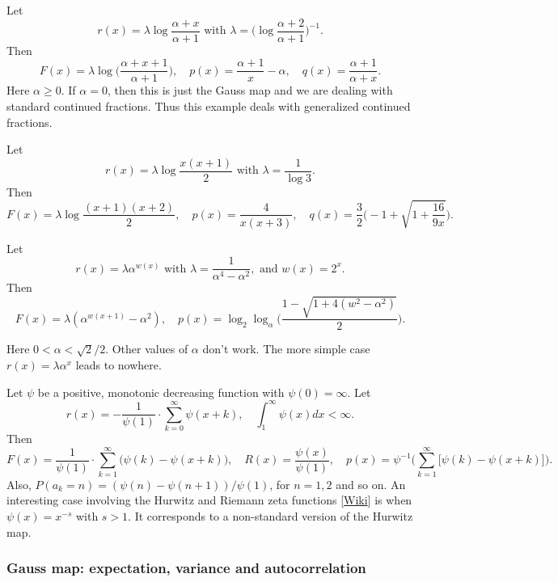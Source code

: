 \documentclass[oneside,10pt]{book}
\begin{document}
\noindent Let
$$r(x)=\lambda\log\frac{\alpha+x}{\alpha+1} \mbox{ with }\lambda=\Big(\log\frac{\alpha+2}{\alpha+1}\Big)^{-1}.$$
Then
$$F(x)=\lambda\log\Big(\frac{\alpha+x+1}{\alpha+1}\Big), \quad
p(x)=\frac{\alpha+1}{x}-\alpha, \quad q(x)=\frac{\alpha+1}{\alpha+x}.$$
Here $\alpha\geq 0$. If $\alpha=0$, then this is just the Gauss map and we are dealing with standard continued fractions.
 Thus this example deals with \textcolor{index}{generalized continued fractions}. \vspace{1ex}


\noindent Let
$$r(x)=\lambda\log\frac{x(x+1)}{2} \mbox{ with }\lambda=\frac{1}{\log 3}.$$
Then $$F(x)=\lambda\log\frac{(x+1)(x+2)}{2}, \quad
p(x)=\frac{4}{x(x+3)}, \quad q(x)=\frac{3}{2}\Bigg(-1+\sqrt{1+\frac{16}{9x}}\Bigg).$$


\noindent Let
$$r(x)=\lambda \alpha^{w(x)} \mbox{ with }\lambda=\frac{1}{\alpha^4-\alpha^2},
 \text{ and }w(x)=2^x.
$$
Then
$$ F(x)=\lambda(\alpha^{w(x+1)}-\alpha^2), \quad
p(x)=\log_2\log_\alpha\Bigg(\frac{1-\sqrt{1+4(w^2-\alpha^2)}}{2}\Bigg).$$

\noindent Here $0<\alpha<\sqrt{2}/2$. Other values of $\alpha$ don't work. The more simple case $r(x)=\lambda \alpha^x$ leads to nowhere. \vspace{1ex}


\noindent Let $\psi$ be a positive, monotonic decreasing function with $\psi(0)=\infty$. 
Let
$$r(x)=-\frac{1}{\psi(1)}\cdot \sum_{k=0}^\infty \psi(x+k), \quad \int_1^\infty\psi(x)dx<\infty.$$ 
Then
$$F(x)= \frac{1}{\psi(1)}\cdot \sum_{k=1}^\infty \Big(\psi(k)-\psi(x+k)\Big),\quad
R(x)=\frac{\psi(x)}{\psi(1)}, \quad p(x)=\psi^{-1}\Bigg(\sum_{k=1}^\infty \Big[\psi(k)-\psi(x+k)\Big]\Bigg).$$
Also, $P(a_k=n) = (\psi(n)-\psi(n+1))/\psi(1)$, for $n=1,2$ and so on. An interesting case involving the 
\textcolor{index}{Hurwitz} and 
\textcolor{index}{Riemann zeta} functions  [\href{https://en.wikipedia.org/wiki/Hurwitz_zeta_function}{Wiki}] is when $\psi(x)=x^{-s}$ with $s>1$. It
 corresponds to a non-standard version of the \textcolor{index}{Hurwitz map}.


\subsubsection{Gauss map: expectation, variance and autocorrelation}
\end{document}
